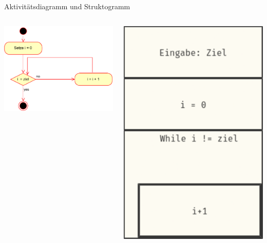 \documentclass[xelatex,aspectratio=169]{beamer}
\begin{document}
\begin{frame}{Aktivitätsdiagramm und Struktogramm}
  \begin{columns}
    \begin{column}{.6\linewidth}
      \includegraphics{fig/algorithmus_aktivitaetsdiagram.drawio.pdf}
    \end{column}
    \begin{column}{.3\linewidth}
      \includegraphics[width=\textwidth]{fig/algorithmus_struktogram.pdf}


\end{column}
\end{columns}
\end{frame}
\end{document}
